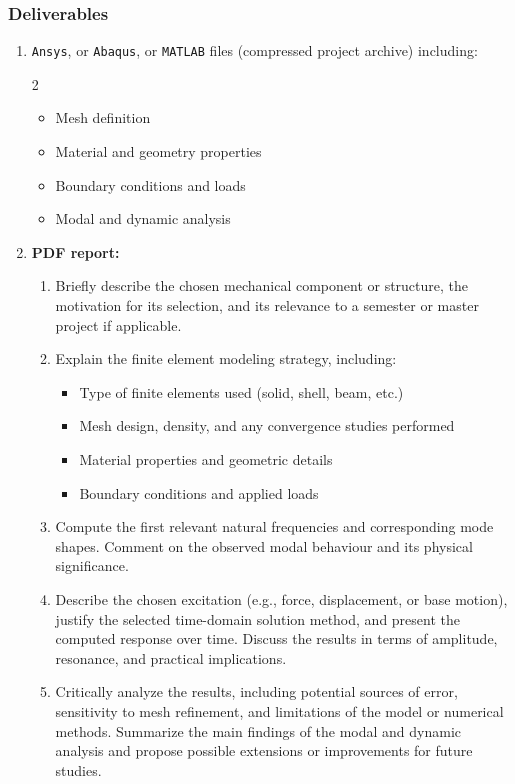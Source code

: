 \documentclass[12pt]{article}
\begin{document}
\subsubsection*{Deliverables}
\begin{enumerate}
  \item \texttt{Ansys}, or \texttt{Abaqus}, or \texttt{MATLAB} files (compressed project archive) including:
        \begin{multicols}{2}
          \begin{itemize}
            \item Mesh definition
            \item Material and geometry properties
            \item Boundary conditions and loads
            \item Modal and dynamic analysis
          \end{itemize}
        \end{multicols}

  \item \textbf{PDF report:}
        \begin{enumerate}[label=\alph*.]
          \item Briefly describe the chosen mechanical component or structure, the motivation for its selection, and its relevance to a semester or master project if applicable.

          \item Explain the finite element modeling strategy, including:
                \begin{itemize}
                  \item Type of finite elements used (solid, shell, beam, etc.)
                  \item Mesh design, density, and any convergence studies performed
                  \item Material properties and geometric details
                  \item Boundary conditions and applied loads
                \end{itemize}

          \item Compute  the first relevant natural frequencies and corresponding mode shapes. Comment on the observed modal behaviour and its physical significance.

          \item Describe the chosen excitation (e.g., force, displacement, or base motion), justify the selected time-domain solution method, and present the computed response over time. Discuss the results in terms of amplitude, resonance, and practical implications.

          \item Critically analyze the results, including potential sources of error, sensitivity to mesh refinement, and limitations of the model or numerical methods. Summarize the main findings of the modal and dynamic analysis and propose possible extensions or improvements for future studies.
        \end{enumerate}
\end{enumerate}
\end{document}
